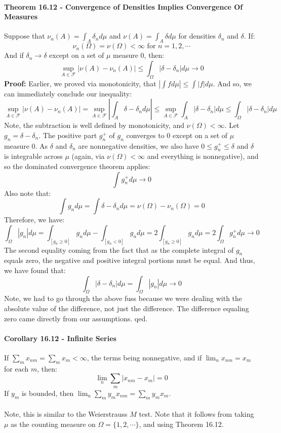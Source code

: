 \documentclass[12pt,a4paper]{article}
\newcommand{\1}[1]{\mathbbm{1}\left\{ #1 \right\}}
\newcommand{\fcal}{\mathcal{F}}
\begin{document}
\paragraph{Theorem 16.12 - Convergence of Densities Implies Convergence Of Measures} Suppose that $\nu_n(A) = \int_A \delta_n d\mu$ and $\nu(A) = \int_A \delta d\mu$ for densities $\delta_n$ and $\delta$. If:
$$
	\nu_n(\Omega) = \nu(\Omega) < \infty \text{ for $n = 1, 2, \cdots$}
$$
And if $\delta_n \to \delta$ except on a set of $\mu$ measure 0, then:
$$
	\sup_{A \in \fcal} |\nu(A) - \nu_n(A)| \leq \int_\Omega |\delta - \delta_n| d\mu \to 0
$$
\textbf{Proof:} Earlier, we proved via monotonicity, that $\left|\int f d\mu \right| \leq \int |f| d\mu$. And so, we can immediately conclude our inequality:
$$
	\sup_{A \in \fcal} |\nu(A) - \nu_n(A)| =
	\sup_{A \in \fcal} \left|\int_A \delta - \delta_n d\mu\right| \leq
	\sup_{A \in \fcal} \int_A |\delta - \delta_n| d\mu \leq
	\int_\Omega |\delta - \delta_n| d\mu
$$
Note, the subtraction is well defined by monotonicity, and $\nu(\Omega) < \infty$. Let $g_n = \delta - \delta_n$. The positive part $g_n^+$ of $g_n$ converges to $0$ except on a set of $\mu$ measure 0. As $\delta$ and $\delta_n$ are nonnegative densities, we also have $0 \leq g_n^+ \leq \delta$ and $\delta$ is integrable across $\mu$ (again, via $\nu(\Omega) < \infty$ and everything is nonnegative), and so the dominated convergence theorem applies:
$$
	\int g_n^+ d\mu \to 0
$$
Also note that:
$$
	\int g_n d\mu = \int \delta - \delta_n d\mu = \nu(\Omega) - \nu_n(\Omega) = 0
$$
Therefore, we have:
$$
	\int_\Omega |g_n| d\mu =
	\int_{[g_n \geq 0]} g_n d\mu - \int_{[g_n < 0]} g_n d\mu =
	2\int_{[g_n \geq 0]} g_n d\mu = 2\int_\Omega g_n^+ d\mu \to 0
$$
The second equality coming from the fact that as the complete integral of $g_n$ equals zero, the negative and positive integral portions must be equal. And thus, we have found that:
$$
	\int_\Omega |\delta - \delta_n| d\mu = \int_\Omega |g_n| d\mu \to 0
$$
Note, we had to go through the above fuss because we were dealing with the absolute value of the difference, not just the difference. The difference equaling zero came directly from our assumptions. qed.

\paragraph{Corollary 16.12 - Infinite Series} If $\sum_m x_{nm} = \sum_m x_m < \infty$, the terms being nonnegative, and if $\lim_n x_{nm} = x_m$ for each $m$, then:
$$
	\lim_n \sum_m |x_{nm} - x_m| = 0
$$
If $y_m$ is bounded, then $\lim_n \sum_m y_m x_{nm} = \sum_m y_m x_m$.
\\\\
Note, this is similar to the Weierstrauss $M$ test. Note that it follows from taking $\mu$ as the counting measure on $\Omega = \{1, 2, \cdots\}$, and using Theorem 16.12.
\end{document}
